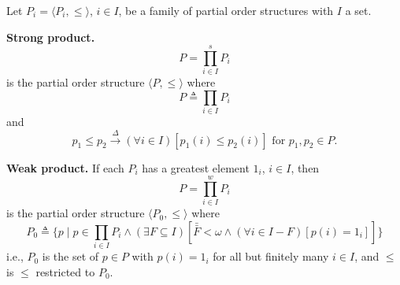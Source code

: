 Let $P_i = \langle P_i, \leq \rangle$, $i \in I$, be a family of partial order structures with $I$ a set.

\textbf{Strong product.}
$$P = \prod_{i \in I}^{s} P_i$$
is the partial order structure $\langle P, \leq \rangle$ where
$$P \triangleq \prod_{i \in I} P_i$$
and
$$p_1 \leq p_2 \xrightarrow{\Delta} (\forall i \in I)[p_1(i) \leq p_2(i)] \text{ for } p_1, p_2 \in P.$$

\textbf{Weak product.} If each $P_i$ has a greatest element $1_i$, $i \in I$, then
$$P = \prod_{i \in I}^{w} P_i$$
is the partial order structure $\langle P_0, \leq \rangle$ where
$$P_0 \triangleq \{ p \mid p \in \prod_{i \in I} P_i \land (\exists F \subseteq I)[\bar{\bar{F}} < \omega \land (\forall i \in I - F)[p(i) = 1_i]] \}$$
i.e., $P_0$ is the set of $p \in P$ with $p(i) = 1_i$ for all but finitely many $i \in I$, and $\leq$ is $\leq$ restricted to $P_0$.
